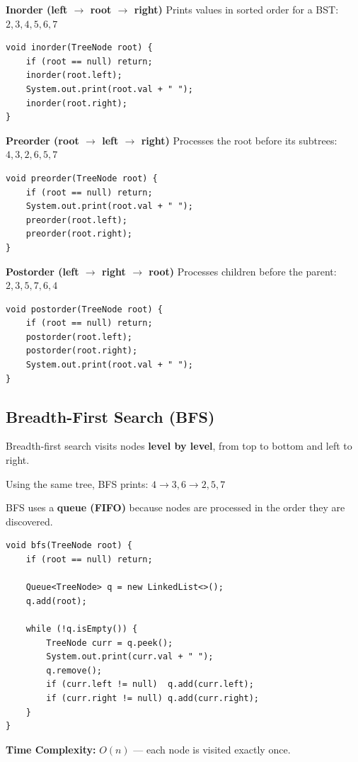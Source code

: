 \begin{center}
\end{center}

\textbf{Inorder (left $\rightarrow$ root $\rightarrow$ right)}  
Prints values in sorted order for a BST: $2, 3, 4, 5, 6, 7$

\begin{verbatim}
void inorder(TreeNode root) {
    if (root == null) return;
    inorder(root.left);
    System.out.print(root.val + " ");
    inorder(root.right);
}
\end{verbatim}

\textbf{Preorder (root $\rightarrow$ left $\rightarrow$ right)}  
Processes the root before its subtrees: $4, 3, 2, 6, 5, 7$

\begin{verbatim}
void preorder(TreeNode root) {
    if (root == null) return;
    System.out.print(root.val + " ");
    preorder(root.left);
    preorder(root.right);
}
\end{verbatim}

\textbf{Postorder (left $\rightarrow$ right $\rightarrow$ root)}  
Processes children before the parent: $2, 3, 5, 7, 6, 4$

\begin{verbatim}
void postorder(TreeNode root) {
    if (root == null) return;
    postorder(root.left);
    postorder(root.right);
    System.out.print(root.val + " ");
}
\end{verbatim}

\subsection{Breadth-First Search (BFS)}

Breadth-first search visits nodes \textbf{level by level}, from top to bottom and left to right.

Using the same tree, BFS prints: $4 \rightarrow 3,6 \rightarrow 2,5,7$

BFS uses a \textbf{queue (FIFO)} because nodes are processed in the order they are discovered.

\begin{verbatim}
void bfs(TreeNode root) {
    if (root == null) return;

    Queue<TreeNode> q = new LinkedList<>();
    q.add(root);

    while (!q.isEmpty()) {
        TreeNode curr = q.peek();
        System.out.print(curr.val + " ");
        q.remove();
        if (curr.left != null)  q.add(curr.left);
        if (curr.right != null) q.add(curr.right);
    }
}
\end{verbatim}

\textbf{Time Complexity:} $O(n)$ --- each node is visited exactly once.